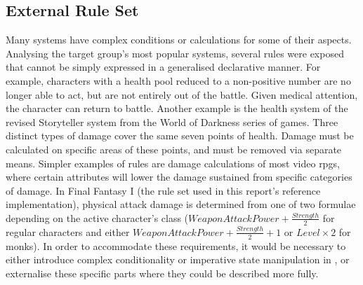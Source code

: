 \subsection{External Rule Set}
\label{language:ruleset}
Many systems have complex conditions or calculations for some of their aspects. Analysing the target group's most popular systems, several rules were exposed that cannot be simply expressed in a generalised declarative manner. For example, characters with a health pool reduced to a non-positive number are no longer able to act, but are not entirely out of the battle. Given medical attention, the character can return to battle. Another example is the health system of the revised Storyteller system from the World of Darkness series of games. Three distinct types of damage cover the same seven points of health. Damage must be calculated on specific areas of these points, and must be removed via separate means.
Simpler examples of rules are damage calculations of most video \ac{rpgs}, where certain attributes will lower the damage sustained from specific categories of damage. In Final Fantasy I (the rule set used in this report's reference implementation), physical attack damage is determined from one of two formulae depending on the active character's class ($WeaponAttackPower + \frac{Strength}{2}$ for regular characters and either $WeaponAttackPower + \frac{Strength}{2} + 1$ or $Level \times 2$ for monks).
In order to accommodate these requirements, it would be necessary to either introduce complex conditionality or imperative state manipulation in \langname{}, or externalise these specific parts where they could be described more fully.

